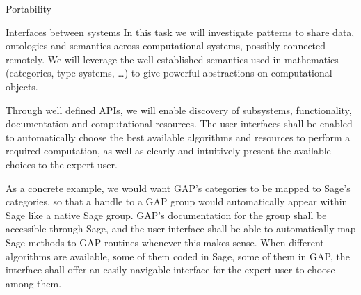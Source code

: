 \begin{Workpackage}{\thewpno}
\begin{task}{Portability}
  \end{task}

  \begin{task}{Interfaces between systems}
    In this task we will investigate patterns to share data,
    ontologies and semantics across computational systems, possibly
    connected remotely.  We will leverage the well established
    semantics used in mathematics (categories, type systems, \dots) to
    give powerful abstractions on computational objects.
    
    Through well defined APIs, we will enable discovery of subsystems,
    functionality, documentation and computational resources. The user
    interfaces shall be enabled to automatically choose the best
    available algorithms and resources to perform a required
    computation, as well as clearly and intuitively present the
    available choices to the expert user.

    As a concrete example, we would want GAP's categories to be mapped
    to Sage's categories, so that a handle to a GAP group would
    automatically appear within Sage like a native Sage group. GAP's
    documentation for the group shall be accessible through Sage, and
    the user interface shall be able to automatically map Sage methods
    to GAP routines whenever this makes sense. When different
    algorithms are available, some of them coded in Sage, some of them
    in GAP, the interface shall offer an easily navigable interface
    for the expert user to choose among them.
  \end{task}


\end{Workpackage}
